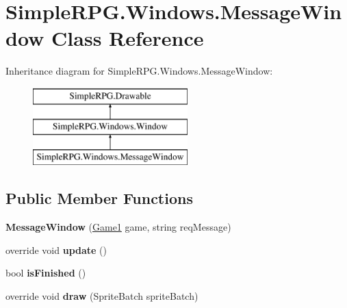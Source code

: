 \hypertarget{class_simple_r_p_g_1_1_windows_1_1_message_window}{\section{Simple\+R\+P\+G.\+Windows.\+Message\+Window Class Reference}
\label{class_simple_r_p_g_1_1_windows_1_1_message_window}
}
Inheritance diagram for Simple\+R\+P\+G.\+Windows.\+Message\+Window\+:\begin{figure}[H]
\begin{center}
\leavevmode
\includegraphics[height=3.000000cm]{class_simple_r_p_g_1_1_windows_1_1_message_window}
\end{center}
\end{figure}
\subsection*{Public Member Functions}
\begin{DoxyCompactItemize}
\item 
\hypertarget{class_simple_r_p_g_1_1_windows_1_1_message_window_aa0d4dc6a22265a7cc941da3891c7e7b3}{{\bfseries Message\+Window} (\hyperlink{class_simple_r_p_g_1_1_game1}{Game1} game, string req\+Message)}\label{class_simple_r_p_g_1_1_windows_1_1_message_window_aa0d4dc6a22265a7cc941da3891c7e7b3}

\item 
\hypertarget{class_simple_r_p_g_1_1_windows_1_1_message_window_aa695ec14b2b596a465dc7b5c9019298a}{override void {\bfseries update} ()}\label{class_simple_r_p_g_1_1_windows_1_1_message_window_aa695ec14b2b596a465dc7b5c9019298a}

\item 
\hypertarget{class_simple_r_p_g_1_1_windows_1_1_message_window_a1ad20623ea7ad20479a064f6b125a90b}{bool {\bfseries is\+Finished} ()}\label{class_simple_r_p_g_1_1_windows_1_1_message_window_a1ad20623ea7ad20479a064f6b125a90b}

\item 
\hypertarget{class_simple_r_p_g_1_1_windows_1_1_message_window_ad84de4bd052fa5fdede8cdb5c749dd9f}{override void {\bfseries draw} (Sprite\+Batch sprite\+Batch)}\label{class_simple_r_p_g_1_1_windows_1_1_message_window_ad84de4bd052fa5fdede8cdb5c749dd9f}

\end{DoxyCompactItemize}
